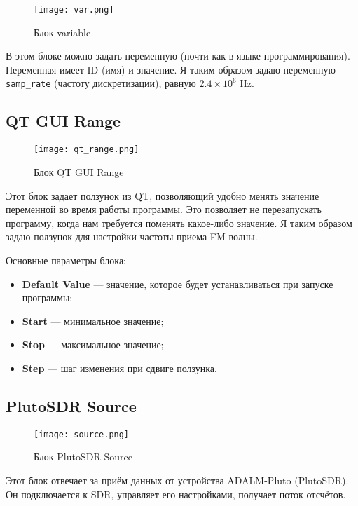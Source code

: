 \begin{figure}[H]
    \centering
    \texttt{[image: var.png]}
    \caption{Блок variable}
\end{figure}

В этом блоке можно задать переменную (почти как в языке программирования). Переменная имеет ID (имя) и значение.  
Я таким образом задаю переменную \texttt{samp\_rate} (частоту дискретизации), равную $2.4 \times 10^6$ Hz.

\subsection*{\textbf{QT GUI Range}}

\begin{figure}[H]
    \centering
    \texttt{[image: qt\_range.png]}
    \caption{Блок QT GUI Range}
\end{figure}

Этот блок задает ползунок из QT, позволяющий удобно менять значение переменной во время работы программы.  
Это позволяет не перезапускать программу, когда нам требуется поменять какое-либо значение.  
Я таким образом задаю ползунок для настройки частоты приема FM волны.

Основные параметры блока: 

\begin{itemize}
    \item \textbf{Default Value} — значение, которое будет устанавливаться при запуске программы;
    \item \textbf{Start} — минимальное значение;
    \item \textbf{Stop} — максимальное значение;
    \item \textbf{Step} — шаг изменения при сдвиге ползунка.
\end{itemize}

\subsection*{\textbf{PlutoSDR Source}}

\begin{figure}[H]
    \centering
    \texttt{[image: source.png]}
    \caption{Блок PlutoSDR Source}
\end{figure}

Этот блок отвечает за приём данных от устройства ADALM-Pluto (PlutoSDR). Он подключается к SDR, управляет его настройками, получает поток отсчётов. \\

